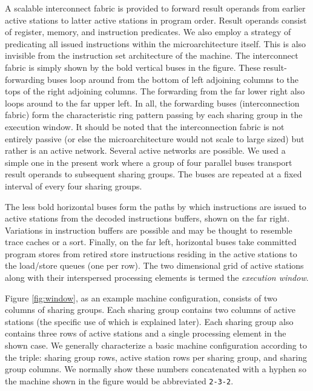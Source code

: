 \documentclass[10pt,dvips]{article}
\begin{document}
A scalable interconnect fabric 
is provided to forward result
operands from earlier active stations to latter active stations in
program order.  Result operands consist of register, memory, and
instruction predicates.  We also employ a strategy of predicating all
issued instructions within the microarchitecture itself.  This is also 
invisible from the instruction set architecture of the machine.
The interconnect fabric is simply shown by
the bold vertical buses in the figure.  These result-forwarding buses
loop around from the bottom of left adjoining columns to the tops of
the right adjoining columns.  The forwarding from the far lower right
also loops around to the far upper left.  In all, the forwarding
buses (interconnection fabric) form the characteristic ring pattern
passing by each sharing group in the execution window.
It should be noted that the interconnection fabric is not
entirely passive (or else the microarchitecture would not
scale to large sized) but rather is an active network.
Several active networks are possible.  We used a simple one
in the present work where a group of four parallel buses transport
result operands to subsequent sharing groups.  The buses are repeated
at a fixed interval of every four sharing groups.

The less bold horizontal buses
form the paths by which instructions are issued to active stations
from the decoded instructions buffers, shown on the far right.
Variations in instruction buffers are possible and may be thought
to resemble trace caches or a sort.
Finally, on the far left, horizontal buses take committed program
stores from retired store instructions residing in the active stations
to the load/store queues (one per row).
The two dimensional
grid of active stations along with their interspersed processing elements
is termed the \textit{execution window}.

Figure \ref{fig:window}, as an example machine configuration, consists of 
two columns of sharing groups.  Each sharing group contains two columns of
active stations (the specific use of which is explained later).
Each sharing group also contains three rows of active stations
and a single processing element in the shown case.  
We generally characterize
a basic machine configuration according to the triple: sharing group
rows, active station
rows per sharing group, and sharing group columns.  We normally
show these numbers concatenated with a hyphen so the machine shown
in the figure would be abbreviated {\tt 2-3-2}.
\end{document}

